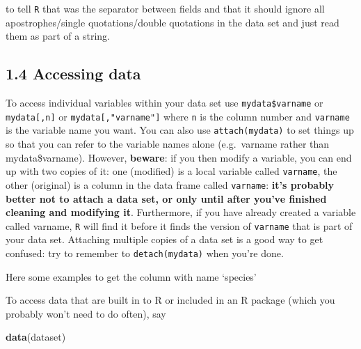 \documentclass[11pt,]{article}
\newenvironment{Shaded}{\begin{snugshade}}{\end{snugshade}}
\newcommand{\KeywordTok}[1]{\textcolor[rgb]{0.13,0.29,0.53}{\textbf{#1}}}
\newcommand{\DecValTok}[1]{\textcolor[rgb]{0.00,0.00,0.81}{#1}}
\newcommand{\StringTok}[1]{\textcolor[rgb]{0.31,0.60,0.02}{#1}}
\newcommand{\CommentTok}[1]{\textcolor[rgb]{0.56,0.35,0.01}{\textit{#1}}}
\newcommand{\OperatorTok}[1]{\textcolor[rgb]{0.81,0.36,0.00}{\textbf{#1}}}
\newcommand{\NormalTok}[1]{#1}
\begin{document}
to tell \texttt{R} that \textbar{} was the separator between fields and
that it should ignore all apostrophes/single quotations/double
quotations in the data set and just read them as part of a string.

\subsection{1.4 Accessing data}\label{accessing-data}

To access individual variables within your data set use
\texttt{mydata\$varname} or \texttt{mydata{[},n{]}} or
\texttt{mydata{[},"varname"{]}} where \texttt{n} is the column number
and \texttt{varname} is the variable name you want. You can also use
\texttt{attach(mydata)} to set things up so that you can refer to the
variable names alone (e.g.~varname rather than mydata\$varname).
However, \textbf{beware}: if you then modify a variable, you can end up
with two copies of it: one (modified) is a local variable called
\texttt{varname}, the other (original) is a column in the data frame
called \texttt{varname}: \textbf{it's probably better not to attach a
data set, or only until after you've finished cleaning and modifying
it}. Furthermore, if you have already created a variable called varname,
\texttt{R} will find it before it finds the version of \texttt{varname}
that is part of your data set. Attaching multiple copies of a data set
is a good way to get confused: try to remember to
\texttt{detach(mydata)} when you're done.

Here some examples to get the column with name `species'

\begin{Shaded}
\end{Shaded}

To access data that are built in to R or included in an R package (which
you probably won't need to do often), say

\begin{Shaded}
\begin{Highlighting}[]
\KeywordTok{data}\NormalTok{(dataset)}
\end{Highlighting}
\end{Shaded}
\end{document}
